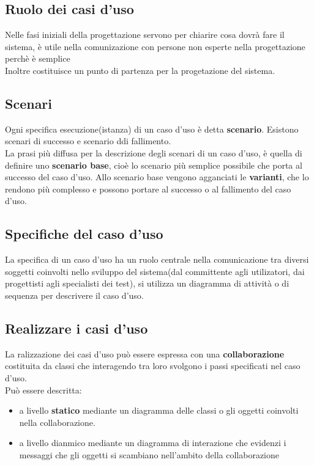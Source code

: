 \documentclass{report}
\begin{document}
                \subsection{Ruolo dei casi d'uso}
                    Nelle fasi iniziali della progettazione servono per chiarire cosa dovrà fare il sistema, è utile nella comunizazione con persone non esperte nella progettazione perchè è semplice
                    \\
                    Inoltre costituisce un punto di partenza per la progetazione del sistema.
                \subsection{Scenari}
                    Ogni specifica esecuzione(istanza) di un caso d'uso è detta \textbf{scenario}. Esistono scenari di successo e scenario ddi fallimento. 
                    \\
                    La prasi più diffusa per la descrizione degli scenari di un caso d'uso, è quella di definire uno \textbf{scenario base}, cioè lo scenario più semplice possibile che porta al successo del caso d'uso. Allo scenario base vengono agganciati le \textbf{varianti}, che lo rendono più complesso e possono portare al successo o al fallimento del caso d'uso.
                \subsection{Specifiche del caso d'uso}
                    La specifica di un caso d'uso ha un ruolo centrale nella comunicazione tra diversi soggetti coinvolti nello sviluppo del sistema(dal committente agli utilizatori, dai progettisti agli specialisti dei test), si utilizza un diagramma di attività o di sequenza per descrivere il caso d'uso.
                \subsection{Realizzare i casi d'uso}
                    La ralizzazione dei casi d'uso può essere espressa con una \textbf{collaborazione} costituita da classi che interagendo tra loro svolgono i passi specificati nel caso d'uso.
                    \\
                    Può essere descritta:
                    \begin{itemize}
                        \item a livello \textbf{statico} mediante un diagramma delle classi o gli oggetti coinvolti nella collaborazione.
                        \item a livello dianmico mediante un diagramma di interazione che evidenzi i messaggi che gli oggetti si scambiano nell'ambito della collaborazione
                    \end{itemize}
\end{document}
